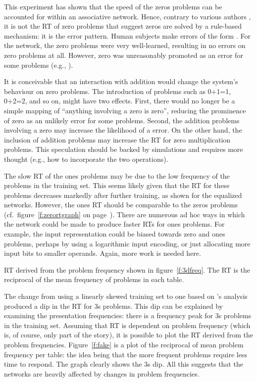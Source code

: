 This experiment has shown that the speed of the zeros problems can be
accounted for within an associative network. Hence, contrary to various
authors \cite{camp85,millcogn,staznetw}, it is not the RT of zero problems
that suggest zeros are solved by a rule-based mechanism: it is the error
pattern.  Human subjects make errors of the form .  For the
network, the zero problems were very well-learned, resulting in no errors
on zero problems at all.  However, zero
was unreasonably promoted as an error
for some problems (e.g., ).

It is conceivable that an interaction with addition would change the
system's
behaviour on zero problems.  The introduction of problems such as
0+1=1, 0+2=2, and so on, might have two effects. First, there would no
longer be a simple mapping of ``anything involving a zero is zero'',
reducing the prominence of zero as an unlikely error for some problems.
Second, the addition problems involving a zero may increase the likelihood
of a  error.  On the other hand, the inclusion of addition
problems may increase the RT for zero multiplication problems.  This
speculation should be backed by simulations and
requires more thought (e.g.,
how to incorporate the two operations).

The slow RT of the ones problems may be due to the low frequency of the
problems in the training set.  This seems likely given that the RT for
these problems decreases markedly after further training, as shown for the
equalized networks. However, the ones RT should be comparable to the zeros
problems (cf.\ figure~\ref{f:zerortgraph} on page~\pageref{f:zerortgraph}).
There are numerous ad
hoc ways in which the network could be made to produce
faster RTs for ones problems.
For example, the input representation could be biased towards
zero and ones problems, perhaps by using a logarithmic input encoding, or
just
allocating more input bits to smaller operands. Again, more work is needed
here.


\begin{fancyfigure}
\centerline{}
\caption{RT derived from the problem frequency shown in
figure~\protect\ref{f:3dfreq}.  The RT is the reciprocal of the mean
frequency of problems in each table.}
\label{f:fake}
\end{fancyfigure}

The change from using a linearly skewed training set to one based on
\citeauthor{siegmult}'s analysis produced a dip in the RT for 3s problems.
This dip can be explained by examining the presentation frequencies: there
is a frequency peak for 3s problems in the training set.  Assuming that RT
is dependent on problem frequency (which is, of course, only part of the
story), it is possible to plot the RT derived from the problem
frequencies.
Figure~\ref{f:fake} is a plot of the reciprocal of mean problem frequency
per table: the idea being that the
more frequent problems require less time to
respond.  The graph clearly shows the 3s dip.  All this suggests that the
networks are heavily affected by changes in problem frequencies.

